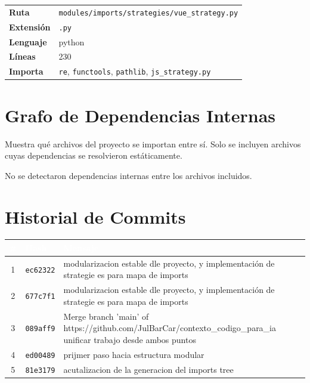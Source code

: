 \documentclass[12pt, a4paper]{report}
\begin{document}
\begin{fichabox}
\small
\begin{tabular}{@{}ll@{}}
  \textbf{Ruta} & \texttt{modules/imports/strategies/vue\_strategy.py} \\
  \textbf{Extensión} & \texttt{.py} \\
  \textbf{Lenguaje} & python \\
  \textbf{Líneas} & 230 \\
  \textbf{Importa} & \parbox[t]{10cm}{\texttt{re}, \texttt{functools}, \texttt{pathlib}, \texttt{js\_strategy.py}} \\
\end{tabular}
\end{fichabox}

\medskip

\chapter{Grafo de Dependencias Internas}

\begin{sectionbox}
Muestra qué archivos del proyecto se importan entre sí.
Solo se incluyen archivos cuyas dependencias se resolvieron estáticamente.
\end{sectionbox}

\medskip

\begin{sectionbox}
No se detectaron dependencias internas entre los archivos incluidos.
\end{sectionbox}

\chapter{Historial de Commits}

\begin{center}
\begin{tabular}{clp{9cm}}
  \toprule
  \rowcolor{tablehead}\textcolor{white}{\textbf{\#}} & \textcolor{white}{\textbf{Hash}} & \textcolor{white}{\textbf{Mensaje}} \\
  \midrule
  1 & \texttt{ec62322} & modularizacion estable dle proyecto, y implementación de strategie es para mapa de imports \\
  2 & \texttt{677c7f1} & modularizacion estable dle proyecto, y implementación de strategie es para mapa de imports \\
  3 & \texttt{089aff9} & Merge branch 'main' of https://github.com/JulBarCar/contexto\_codigo\_para\_ia unificar trabajo desde ambos puntos \\
  4 & \texttt{ed00489} & prijmer paso hacia estructura modular \\
  5 & \texttt{81e3179} & acutalizacion de la generacion del imports tree \\
  \bottomrule
\end{tabular}
\end{center}
\end{document}
